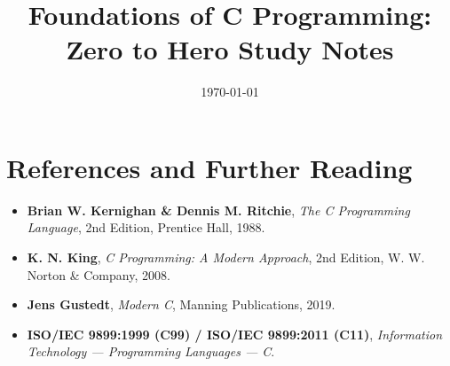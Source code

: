 \documentclass[11pt,a4paper,oneside]{book}
\title{Foundations of C Programming: Zero to Hero Study Notes}
\author{\authorname}
\date{\today}
\begin{document}
\frontmatter
\maketitle
\tableofcontents

\mainmatter



\backmatter
\chapter{References and Further Reading}
\begin{itemize}
    \item \textbf{Brian W. Kernighan \& Dennis M. Ritchie}, \textit{The C Programming Language}, 2nd Edition, Prentice Hall, 1988.
    \item \textbf{K. N. King}, \textit{C Programming: A Modern Approach}, 2nd Edition, W. W. Norton \& Company, 2008.
    \item \textbf{Jens Gustedt}, \textit{Modern C}, Manning Publications, 2019.
    \item \textbf{ISO/IEC 9899:1999 (C99) / ISO/IEC 9899:2011 (C11)}, \textit{Information Technology --- Programming Languages --- C}.
\end{itemize}
\end{document}
